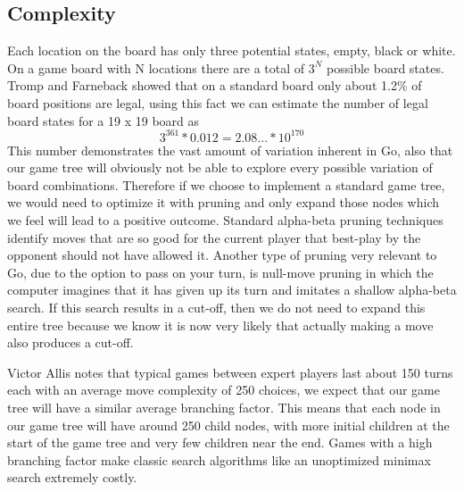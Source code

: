 \documentclass[conference]{IEEEtran}
\begin{document}
\subsection{Complexity}
Each location on the board has only three potential states, empty, black or white. On a game board with N locations there are a total of $3^N$ possible board states. Tromp and Farneback showed that on a standard board only about 1.2\% of board positions are legal, using this fact we can estimate the number of legal board states for a 19 x 19 board as \[3^{361} * 0.012 = 2.08\dots * 10^{170}\]This number demonstrates the vast amount of variation inherent in Go, also that our game tree will obviously not be able to explore every possible variation of board combinations. Therefore if we choose to implement a standard game tree, we would need to optimize it with pruning and only expand those nodes which we feel will lead to a positive outcome. Standard alpha-beta pruning techniques identify moves that are so good for the current player that best-play by the opponent should not have allowed it. Another type of pruning very relevant to Go, due to the option to pass on your turn, is null-move pruning in which the computer imagines that it has given up its turn and imitates a shallow alpha-beta search. If this search results in a cut-off, then we do not need to expand this entire tree because we know it is now very likely that actually making a move also produces a cut-off.\par
Victor Allis notes that typical games between expert players last about 150 turns each with an average move complexity of 250 choices, we expect that our game tree will have a similar average branching factor. This means that each node in our game tree will have around 250 child nodes, with more initial children at the start of the game tree and very few children near the end. Games with a high branching factor make classic search algorithms like an unoptimized minimax search extremely costly.
\end{document}
